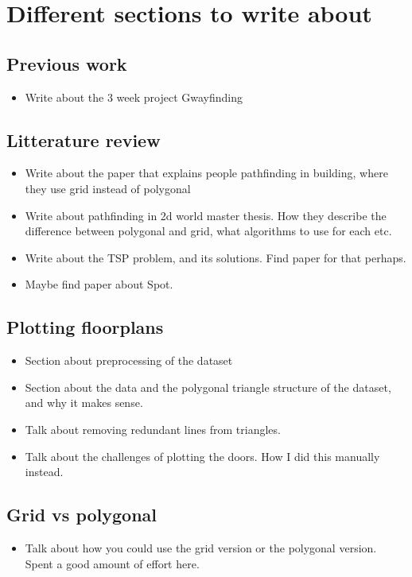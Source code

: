 \section{Different sections to write about}

\subsection{Previous work}
\begin{itemize}
    \item Write about the 3 week project Gwayfinding
\end{itemize}

\subsection{Litterature review}
\begin{itemize}
    \item Write about the paper that explains people pathfinding in building, where they use grid instead of polygonal
    \item Write about pathfinding in 2d world master thesis. How they describe the difference between polygonal and grid, what algorithms to use for each etc.
    \item Write about the TSP problem, and its solutions. Find paper for that perhaps.
    \item Maybe find paper about Spot.
\end{itemize}


\subsection{Plotting floorplans}
\begin{itemize}
    \item Section about preprocessing of the dataset
    \item Section about the data and the polygonal triangle structure of the dataset, and why it makes sense.
    \item Talk about removing redundant lines from triangles.
    \item Talk about the challenges of plotting the doors. How I did this manually instead.
\end{itemize}

\subsection{Grid vs polygonal}
\begin{itemize}
    \item Talk about how you could use the grid version or the polygonal version. Spent a good amount of effort here.
\end{itemize}

